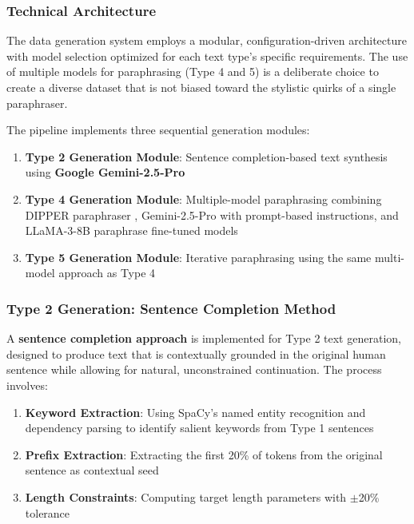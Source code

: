\subsubsection{Technical Architecture}
The data generation system employs a modular, configuration-driven architecture with model selection optimized for each text type's specific requirements. The use of multiple models for paraphrasing (Type 4 and 5) is a deliberate choice to create a diverse dataset that is not biased toward the stylistic quirks of a single paraphraser.

The pipeline implements three sequential generation modules:
\begin{enumerate}
    \item \textbf{Type 2 Generation Module}: Sentence completion-based text synthesis using \textbf{Google Gemini-2.5-Pro}
    \item \textbf{Type 4 Generation Module}: Multiple-model paraphrasing combining DIPPER paraphraser \cite{krishna2023paraphrasingevadesdetectorsaigenerated}, Gemini-2.5-Pro with prompt-based instructions, and LLaMA-3-8B paraphrase fine-tuned models \cite{mradermacher2024llama31paraphrase}
    \item \textbf{Type 5 Generation Module}: Iterative paraphrasing using the same multi-model approach as Type 4
\end{enumerate}

\subsubsection{Type 2 Generation: Sentence Completion Method}

A \textbf{sentence completion approach} is implemented for Type 2 text generation, designed to produce text that is contextually grounded in the original human sentence while allowing for natural, unconstrained continuation. The process involves:

\begin{enumerate}
    \item \textbf{Keyword Extraction}: Using SpaCy's named entity recognition and dependency parsing to identify salient keywords from Type 1 sentences
    \item \textbf{Prefix Extraction}: Extracting the first 20\% of tokens from the original sentence as contextual seed
    \item \textbf{Length Constraints}: Computing target length parameters with $\pm$20\% tolerance
\end{enumerate}

